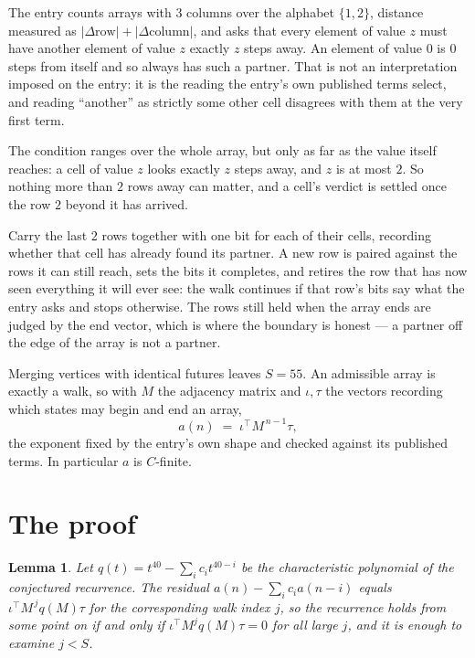 \documentclass[11pt,a4paper]{article}
\theoremstyle{plain}
\newtheorem{lemma}[theorem]{Lemma}
\theoremstyle{definition}
\begin{document}
The entry counts arrays with $3$ columns over the alphabet $\{1,2\}$, distance measured as $|\Delta \text{row}|+|\Delta \text{column}|$, and asks that every element of value $z$ must have another element of value $z$ exactly $z$ steps away. An element of value $0$ is $0$ steps from itself and so always has such a partner. That is not an interpretation imposed on the entry: it is the reading the entry's own published terms select, and reading ``another'' as strictly some other cell disagrees with them at the very first term.

The condition ranges over the whole array, but only as far as the value itself reaches: a cell of value $z$ looks exactly $z$ steps away, and $z$ is at most $2$. So nothing more than $2$ rows away can matter, and a cell's verdict is settled once the row $2$ beyond it has arrived.

Carry the last $2$ rows together with one bit for each of their cells, recording whether that cell has already found its partner. A new row is paired against the rows it can still reach, sets the bits it completes, and retires the row that has now seen everything it will ever see: the walk continues if that row's bits say what the entry asks and stops otherwise. The rows still held when the array ends are judged by the end vector, which is where the boundary is honest --- a partner off the edge of the array is not a partner.

Merging vertices with identical futures leaves $S=55$. An admissible array is exactly a walk, so with $M$ the adjacency matrix and $\iota,\tau$ the vectors recording which states may begin and end an array,
\[
a(n)\;=\;\iota^{\!\top}M^{\,n-1}\tau ,
\]
the exponent fixed by the entry's own shape and checked against its published terms. In
particular $a$ is $C$-finite.

\section{The proof}

\begin{lemma}\label{lem:crit}
Let $q(t)=t^{40}-\sum_i c_it^{40-i}$ be the characteristic polynomial of the
conjectured recurrence. The residual $a(n)-\sum_ic_ia(n-i)$ equals
$\iota^{\!\top}M^{\,j}q(M)\tau$ for the corresponding walk index $j$, so the recurrence
holds from some point on if and only if $\iota^{\!\top}M^{j}q(M)\tau=0$ for all large $j$,
and it is enough to examine $j<S$.
\end{lemma}
\end{document}
